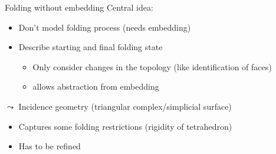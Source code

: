 \begin{frame}{Folding without embedding}
    \pause
    Central idea:
    \begin{itemize}
        \pause
        \item Don't model folding process (needs embedding)
        \pause
        \item Describe starting and final folding state
            \begin{itemize}
                \pause
                \item Only consider changes in the topology
                    \pause (like identification of faces)
                \pause
                \item allows abstraction from embedding
            \end{itemize}
    \end{itemize}

    \pause
    $\leadsto$ Incidence geometry (triangular complex/simplicial surface)

    \begin{itemize}
        \pause
        \item Captures some folding restrictions (rigidity of tetrahedron)
        \pause
        \item Has to be refined
    \end{itemize}
\end{frame}

\newcommand{\colFaceA}{\colorFaceA}
\newcommand{\colFaceB}{\colorFaceB}
\newcommand{\colFaceC}{\colorFaceC}


